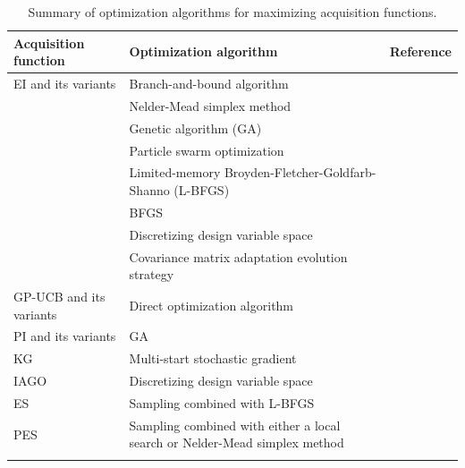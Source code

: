 \documentclass[iicol,sn-basic]{sn-jnl}%
\theoremstyle{thmstyleone}%
\theoremstyle{thmstyletwo}
\theoremstyle{thmstylethree}
\begin{document}
\begin{linenumbers}
\begin{table}
	\caption{Summary of optimization algorithms for maximizing acquisition functions.}
	\label{Table5}
	\centering
	\begin{tabularx}{\textwidth}{lXX}
		\hline \noalign{\smallskip}
 		Acquisition function & Optimization algorithm & Reference\\
		\hline \noalign{\smallskip}
		
		 EI and its variants & Branch-and-bound algorithm & \cite{Jones1998}\\
		 \noalign{\smallskip}
		 & Nelder-Mead simplex method & \cite{Huang2006,Huang2006a}\\
		 \noalign{\smallskip}
		 & Genetic algorithm (GA) & \cite{Forrester2007,Chen2016,YZhang2018,Bailly2019,Do2022}\\
		 \noalign{\smallskip}
		 & Particle swarm optimization & \cite{Kontogiannis2020b,Ribeiro2023}\\
		 \noalign{\smallskip}
		 & Limited-memory  Broyden-Fletcher-Goldfarb-Shanno (L-BFGS) & \cite{Frazier2018,Bonfiglio2018b}\\
		 \noalign{\smallskip}
		 & BFGS & \cite{Sobester2005}\\
		 \noalign{\smallskip}
		 & Discretizing design variable space & \cite{Ghoreishi2019,Grassi2023}\\
		 \noalign{\smallskip}
		 & Covariance matrix adaptation evolution strategy & \cite{Tran2020a,Tran2020b}\\
		\noalign{\smallskip}
		
		GP-UCB and its variants & Direct optimization algorithm & \cite{Kandasamy2016,Kandasamy2017}\\
		\noalign{\smallskip}
		
		PI and its variants & GA & \cite{Ruan2020}\\
		\noalign{\smallskip}
		
		KG & Multi-start stochastic gradient& \cite{JWu2016}\\
		\noalign{\smallskip}
		
		IAGO & Discretizing design variable space & \cite{Villemonteix2009}\\
		\noalign{\smallskip}
		
		ES & Sampling combined with L-BFGS & \cite{Hennig2012}\\
		\noalign{\smallskip}
		
		PES & Sampling combined with either a local search or Nelder-Mead simplex method& \cite{Lobato2014}\\
		\noalign{\smallskip}
		

\end{tabularx}
\end{table}
\end{linenumbers}
\end{document}
